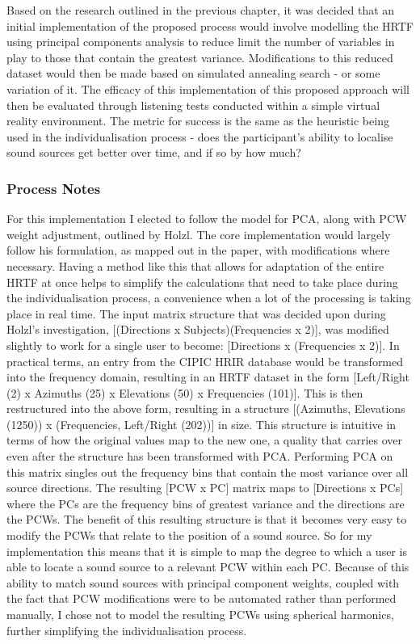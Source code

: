 Based on the research outlined in the previous chapter, it was decided that an initial implementation of the proposed process would involve modelling the HRTF using principal components analysis to reduce limit the number of variables in play to those that contain the greatest variance. Modifications to this reduced dataset would then be made based on simulated annealing search - or some variation of it. The efficacy of this implementation of this proposed approach will then be evaluated through listening tests conducted within a simple virtual reality environment. The metric for success is the same as the heuristic being used in the individualisation process - does the participant's ability to localise sound sources get better over time, and if so by how much?

\subsubsection{Process Notes}
For this implementation I elected to follow the model for PCA, along with PCW weight adjustment, outlined by Holzl\citep{Holzl2014a}. The core implementation would largely follow his formulation, as mapped out in the paper, with modifications where necessary. Having a method like this that allows for adaptation of the entire HRTF at once helps to simplify the calculations that need to take place during the individualisation process, a convenience when a lot of the processing is taking place in real time. The input matrix structure that was decided upon during Holzl's investigation, [(Directions x Subjects)(Frequencies x 2)], was modified slightly to work for a single user to become: [Directions x (Frequencies x 2)]. In practical terms, an entry from the CIPIC HRIR database would be transformed into the frequency domain, resulting in an HRTF dataset in the form [Left/Right (2) x Azimuths (25) x Elevations (50) x Frequencies (101)]. This is then restructured into the above form, resulting in a structure [(Azimuths, Elevations (1250)) x (Frequencies, Left/Right (202))] in size. This structure is intuitive in terms of how the original values map to the new one, a quality that carries over even after the structure has been transformed with PCA. Performing PCA on this matrix singles out the frequency bins that contain the most variance over all source directions. The resulting [PCW x PC] matrix maps to [Directions x PCs] where the PCs are the frequency bins of greatest variance and the directions are the PCWs. The benefit of this resulting structure is that it becomes very easy to modify the PCWs that relate to the position of a sound source. So for my implementation this means that it is simple to map the degree to which a user is able to locate a sound source to a relevant PCW within each PC. Because of this ability to match sound sources with principal component weights, coupled with the fact that PCW modifications were to be automated rather than performed manually, I chose not to model the resulting PCWs using spherical harmonics, further simplifying the individualisation process. 


